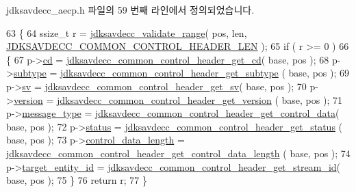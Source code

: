 jdksavdecc\+\_\+aecp.\+h 파일의 59 번째 라인에서 정의되었습니다.


\begin{DoxyCode}
63 \{
64     ssize\_t r = \hyperlink{group__util_ga9c02bdfe76c69163647c3196db7a73a1}{jdksavdecc\_validate\_range}( pos, len, 
      \hyperlink{group__jdksavdecc__avtp__common__control__header_gaae84052886fb1bb42f3bc5f85b741dff}{JDKSAVDECC\_COMMON\_CONTROL\_HEADER\_LEN} );
65     \textcolor{keywordflow}{if} ( r >= 0 )
66     \{
67         p->\hyperlink{structjdksavdecc__aecpdu__common__control__header_a8bdacfca3faaf5f7d020bbe533855525}{cd} = \hyperlink{group__jdksavdecc__avtp__common__control__header_gafcc86a6636d8793da33a2da4995b3a15}{jdksavdecc\_common\_control\_header\_get\_cd}( base, pos
       );
68         p->\hyperlink{structjdksavdecc__aecpdu__common__control__header_a8613e2fef78de5c8994bc1b1ce55dc2f}{subtype} = \hyperlink{group__jdksavdecc__avtp__common__control__header_ga42ef04eef2565c32449a0593033de47b}{jdksavdecc\_common\_control\_header\_get\_subtype}
      ( base, pos );
69         p->\hyperlink{structjdksavdecc__aecpdu__common__control__header_aff36ae5f31d03185ca79d7eae0977fda}{sv} = \hyperlink{group__jdksavdecc__avtp__common__control__header_ga00819aee969a77e05716ede751b99201}{jdksavdecc\_common\_control\_header\_get\_sv}( base, pos
       );
70         p->\hyperlink{structjdksavdecc__aecpdu__common__control__header_ab22abc2906422da61885ac6c8e6a1a59}{version} = \hyperlink{group__jdksavdecc__avtp__common__control__header_ga901a41cbf974ed959f4baaafa2a3c81d}{jdksavdecc\_common\_control\_header\_get\_version}
      ( base, pos );
71         p->\hyperlink{structjdksavdecc__aecpdu__common__control__header_aeaaffeace8c23899e558022f62ce6de4}{message\_type} = 
      \hyperlink{group__jdksavdecc__avtp__common__control__header_gacb435e5d647474931972cb9eb93b4e41}{jdksavdecc\_common\_control\_header\_get\_control\_data}( base, 
      pos );
72         p->\hyperlink{structjdksavdecc__aecpdu__common__control__header_ade818037fd6c985038ff29656089758d}{status} = \hyperlink{group__jdksavdecc__avtp__common__control__header_ga4a4d44fa74bdb873eab982d74862273c}{jdksavdecc\_common\_control\_header\_get\_status}
      ( base, pos );
73         p->\hyperlink{structjdksavdecc__aecpdu__common__control__header_acc7cd70455e6e455ac498477b95f9e21}{control\_data\_length} = 
      \hyperlink{group__jdksavdecc__avtp__common__control__header_ga2d89ba7b9520f61839d222bdb2494e24}{jdksavdecc\_common\_control\_header\_get\_control\_data\_length}
      ( base, pos );
74         p->\hyperlink{structjdksavdecc__aecpdu__common__control__header_a6928214f4610ef10e95ba5c74ac5b06e}{target\_entity\_id} = 
      \hyperlink{group__jdksavdecc__avtp__common__control__header_ga99181000ee374936c8518f657fa9f5cd}{jdksavdecc\_common\_control\_header\_get\_stream\_id}( base, pos );
75     \}
76     \textcolor{keywordflow}{return} r;
77 \}
\end{DoxyCode}


